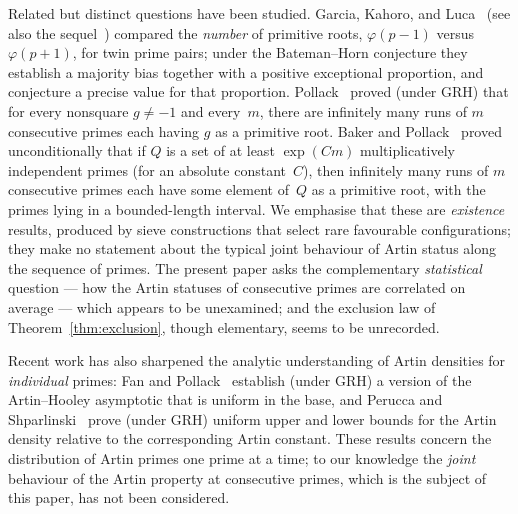 \documentclass[11pt]{amsart}
\theoremstyle{definition}
\begin{document}
Related but distinct questions have been studied. Garcia, Kahoro, and
Luca~\cite{GarciaKahoroLuca2019} (see also the sequel~\cite{GarciaLucaShiUdell2020})
compared the \emph{number} of primitive roots, $\varphi(p-1)$ versus
$\varphi(p+1)$, for twin prime pairs; under the Bateman--Horn conjecture they
establish a majority bias together with a positive exceptional proportion, and
conjecture a precise value for that proportion. Pollack~\cite{Pollack2014} proved
(under GRH) that for every nonsquare $g \neq -1$ and every~$m$, there are
infinitely many runs of $m$ consecutive primes each having $g$ as a primitive
root. Baker and Pollack~\cite{BakerPollack2016} proved unconditionally that
if $Q$ is a set of at least $\exp(Cm)$ multiplicatively independent primes
(for an absolute constant~$C$), then infinitely many runs of $m$ consecutive
primes each have some element of~$Q$ as a primitive root, with the primes
lying in a bounded-length interval.
We emphasise that these are
\emph{existence} results, produced by sieve constructions that select rare
favourable configurations; they make no statement about the typical joint
behaviour of Artin status along the sequence of primes. The present paper asks
the complementary \emph{statistical} question --- how the Artin statuses of
consecutive primes are correlated on average --- which appears to be
unexamined; and the exclusion law of Theorem~\ref{thm:exclusion}, though
elementary, seems to be unrecorded.

Recent work has also sharpened the analytic understanding of Artin densities
for \emph{individual} primes: Fan and Pollack~\cite{FanPollack2025} establish
(under GRH) a version of the Artin--Hooley asymptotic that is uniform in the
base, and Perucca and Shparlinski~\cite{PeruccaShparlinski2025} prove (under GRH) uniform
upper and lower bounds for the Artin density relative to the corresponding
Artin constant. These results concern the distribution of Artin primes one
prime at a time; to our knowledge the \emph{joint} behaviour of the Artin
property at consecutive primes, which is the subject of this paper, has not
been considered.
\end{document}
